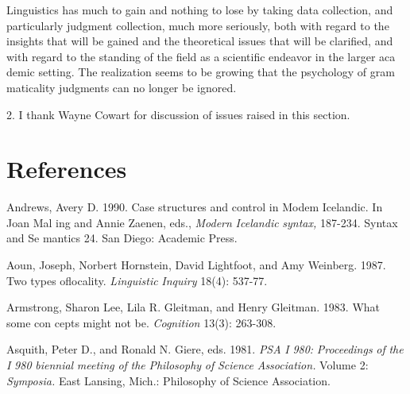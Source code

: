 \begin{styleStandard}
Linguistics has much to gain and nothing to lose by taking data collection, {\textquotesingle} and particularly judgment collection, much more seriously, both with regard to the insights that will be gained and the theoretical issues that will be clarified, and with regard to the standing of the field as a scientific endeavor in the larger aca\- demic setting. The realization seems to be growing that the psychology of gram\- maticality judgments can no longer be ignored.
\end{styleStandard}


\begin{styleStandard}
2. I thank Wayne Cowart for discussion of issues raised in this section.
\end{styleStandard}


\clearpage\setcounter{page}{1}\section[References]{References}
\begin{styleStandard}
Andrews, Avery D. 1990. Case structures and control in Modem Icelandic. In Joan Mal\- ing and Annie Zaenen, eds., \textit{Modern}\textit{ }\textit{Icelandic}\textit{ }\textit{syntax,}\textit{ }187-234. Syntax and Se\- mantics 24. San Diego: Academic Press.
\end{styleStandard}


\begin{styleStandard}
Aoun, Joseph, Norbert Hornstein, David Lightfoot, and Amy Weinberg. 1987. Two types oflocality. \textit{Linguistic}\textit{ }\textit{Inquiry}\textit{ }18(4): 537-77.
\end{styleStandard}


\begin{styleStandard}
Armstrong, Sharon Lee, Lila R. Gleitman, and Henry Gleitman. 1983. What some con\- cepts might not be. \textit{Cognition}\textit{ }13(3): 263-308.
\end{styleStandard}


\begin{styleStandard}
Asquith, Peter D., and Ronald N. Giere, eds. 1981. \textit{PSA}\textit{ }\textit{I}\textit{ }\textit{980:}\textit{ }\textit{Proceedings}\textit{ }\textit{of}\textit{ }\textit{the}\textit{ }\textit{I}\textit{ }\textit{980}\textit{ }\textit{biennial}\textit{ }\textit{meeting}\textit{ }\textit{of}\textit{ }\textit{the}\textit{ }\textit{Philosophy}\textit{ }\textit{of}\textit{ }\textit{Science}\textit{ }\textit{Association.}\textit{ }Volume 2: \textit{Symposia.}\textit{ }East Lansing, Mich.: Philosophy of Science Association.
\end{styleStandard}


